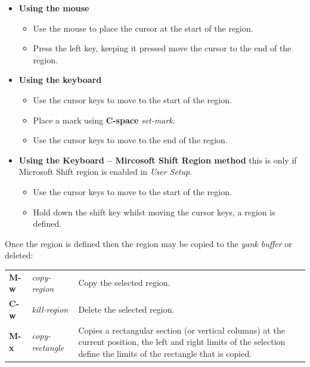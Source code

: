 \documentclass[11pt,a4paper,pdftex]{article}
\begin{document}
  \begin{itemize}

    \item \textbf{Using the mouse}
    \begin{itemize}
      \item Use the mouse to place the cursor at the start of the region.
      \item Press the left key, keeping it pressed move the cursor to the end
      of the region.
    \end{itemize}

    \item \textbf{Using the keyboard}
    \begin{itemize}
      \item Use the cursor keys to move to the start of the region.
      \item Place a mark using \textbf{C-space} \textit{set-mark}.
      \item Use the cursor keys to move to the end of the region.
    \end{itemize}

    \item \textbf{Using the Keyboard -- Mircosoft Shift Region method} this is
    only if Microsoft Shift region is enabled in \textit{User Setup}.

    \begin{itemize}
      \item Use the cursor keys to move to the start of the region.
      \item Hold down the shift key whilst moving the cursor keys, a region
      is defined.
    \end{itemize}
  \end{itemize}

  Once the region is defined then the region may be copied to the \textit{yank
  buffer} or deleted:

  \begin{longtable}{ll@{\ --\ }l}
    \endhead
    \endfoot
    \endlastfoot
    \textbf{M-w} & \textit{copy-region} &
    Copy the selected region.\\
    \textbf{C-w} & \textit{kill-region} &
    Delete the selected region.\\
    \textbf{M-x} & \textit{copy-rectangle} &
    Copies a rectangular section (or vertical columns) at the current
    position, the left and right limits of the selection define the limits of
    the rectangle that is copied.\\
  \end{longtable}
\end{document}
